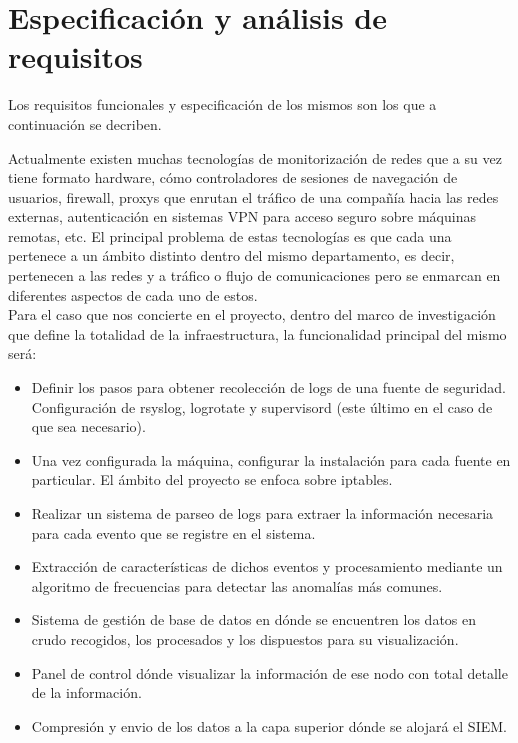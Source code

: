 \chapter[Requisitos]{Especificación y análisis de requisitos}
\label{chap:requisitos}

Los requisitos funcionales y especificación de los mismos son los que a continuación se decriben.

Actualmente existen muchas tecnologías de monitorización de redes que a su vez tiene formato hardware, cómo controladores de sesiones de navegación de usuarios, firewall, proxys que enrutan el tráfico de una compañía hacia las redes externas, autenticación en sistemas VPN para acceso seguro sobre máquinas remotas, etc. El principal problema de estas tecnologías es que cada una pertenece a un ámbito distinto dentro del mismo departamento, es decir, pertenecen a las redes y a tráfico o flujo de comunicaciones pero se enmarcan en diferentes aspectos de cada uno de estos. \\

Para el caso que nos concierte en el proyecto, dentro del marco de investigación que define la totalidad de la infraestructura, la funcionalidad principal del mismo será:

\begin{itemize}
\item Definir los pasos para obtener recolección de logs de una fuente de seguridad. Configuración de rsyslog, logrotate y supervisord (este último en el caso de que sea necesario).
\item Una vez configurada la máquina, configurar la instalación para cada fuente en particular. El ámbito del proyecto se enfoca sobre iptables.
\item Realizar un sistema de parseo de logs para extraer la información necesaria para cada evento que se registre en el sistema.
\item Extracción de características de dichos eventos y procesamiento mediante un algoritmo de frecuencias para detectar las anomalías más comunes.
\item Sistema de gestión de base de datos en dónde se encuentren los datos en crudo recogidos, los procesados y los dispuestos para su visualización.
\item Panel de control dónde visualizar la información de ese nodo con total detalle de la información.
\item Compresión y envio de los datos a la capa superior dónde se alojará el SIEM.
\end{itemize}

